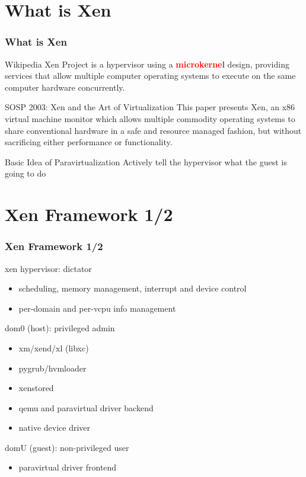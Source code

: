\documentclass[aspectratio=169]{beamer}
\begin{document}

\section {What is Xen}
\begin{frame}
\frametitle{What is Xen}
\begin{block}{Wikipedia}
Xen Project is a hypervisor using a \textbf{\textcolor{red}{microkernel}} design, providing services that allow multiple computer operating systems to execute on the same computer hardware concurrently.
\end{block} \pause
\begin{block}{SOSP 2003: Xen and the Art of Virtualization}
This paper presents Xen, an x86 virtual machine monitor which allows multiple commodity operating systems to share conventional hardware in a safe and resource managed fashion, but without sacrificing either performance or functionality. \pause
\end{block}
\begin{block}{Basic Idea of Paravirtualization}
Actively tell the hypervisor what the guest is going to do
\end{block}
\end{frame}


\section{Xen Framework 1/2}
\begin{frame}
\frametitle{Xen Framework 1/2}
\begin{block}{xen hypervisor: dictator}
\begin{itemize}
\item scheduling, memory management, interrupt and device control
\item per-domain and per-vcpu info management
\end{itemize}
\end{block} \pause
\begin{block}{dom0 (host): privileged admin}
\begin{itemize}
\item xm/xend/xl (libxc)
\item pygrub/hvmloader
\item xenstored
\item qemu and paravirtual driver backend
\item native device driver
\end{itemize}
\end{block} \pause
\begin{block}{domU (guest): non-privileged user}
\begin{itemize}
\item paravirtual driver frontend
\end{itemize}
\end{block}
\end{frame}
\end{document}
